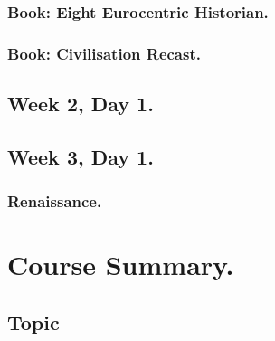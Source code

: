 \documentclass[11pt]{book}
\begin{document}
				
		\section{Book: Eight Eurocentric Historian.}

		\section{Book: Civilisation Recast.}


\chapter{Week 2, Day 1.}

\chapter{Week 3, Day 1.}
	\section{Renaissance.}
\part{Course Summary.}
	\chapter{Topic}
\end{document}
